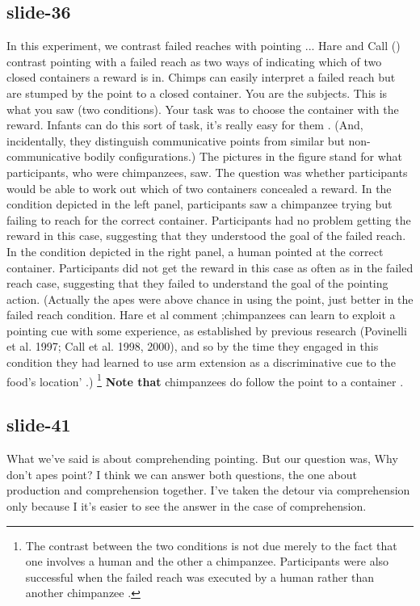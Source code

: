 \documentclass[12pt,\papersize]{extarticle}
\begin{document}
\subsection{slide-36}
In this experiment, we contrast failed reaches with pointing ...
Hare and Call (\citeyear{hare_chimpanzees_2004}) contrast pointing with a failed reach as two ways of indicating which of two closed containers a reward is in. Chimps can easily interpret a failed reach but are stumped by the point to a closed container.
You are the subjects. This is what you saw (two conditions). Your task was to choose the container with the reward.
Infants can do this sort of task, it's really easy for them \citep{Behne:2005qh}. (And, incidentally, they distinguish communicative points from similar but non-communicative bodily configurations.)
The pictures in the figure stand for what participants, who were chimpanzees, saw.
The question was whether participants would be able to work out which of two containers concealed a reward.
In the condition depicted in the left panel, participants saw a chimpanzee trying but failing to reach for the correct container.
Participants had no problem getting the reward in this case, suggesting that they understood the goal of the failed reach.
In the condition depicted in the right panel, a human pointed at the correct container.
Participants did not get the reward in this case as often as in the failed reach case, suggesting that they failed to understand the goal of the pointing action.
(Actually the apes were above chance in using the point, just better in the failed reach condition. Hare et al comment ;chimpanzees can learn to exploit a pointing cue with some experience, as established by previous research (Povinelli et al. 1997; Call et al. 1998, 2000), and so by the time they engaged in this condition they had learned to use arm extension as a discriminative cue to the food’s location' \citep[p.\ 578]{hare_chimpanzees_2004}.)
\footnote{ The contrast between the two conditions is not due merely to the fact that one involves a human and the other a chimpanzee. Participants were also successful when the failed reach was executed by a human rather than another chimpanzee \citep[][experiment 1]{hare_chimpanzees_2004}. }
\textbf{Note that} chimpanzees do follow the point to a container \citep[see][p.\ 6]{Moll:2007gu}.
 
 
\subsection{slide-41}
What we've said is about comprehending pointing.
But our question was, Why don't apes point?
I think we can answer both questions, the one about production and comprehension together.
I've taken the detour via comprehension only because I it's easier to see the answer in the case of comprehension.
 
\end{document}
